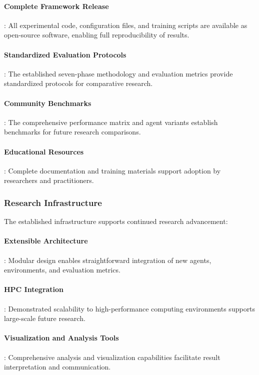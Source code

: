 \documentclass[12pt,oneside]{article}
\begin{document}
\paragraph{Complete Framework Release}: All experimental code, configuration files, and training scripts are available as open-source software, enabling full reproducibility of results.

\paragraph{Standardized Evaluation Protocols}: The established seven-phase methodology and evaluation metrics provide standardized protocols for comparative research.

\paragraph{Community Benchmarks}: The comprehensive performance matrix and agent variants establish benchmarks for future research comparisons.

\paragraph{Educational Resources}: Complete documentation and training materials support adoption by researchers and practitioners.

\subsubsection{Research Infrastructure}
The established infrastructure supports continued research advancement:

\paragraph{Extensible Architecture}: Modular design enables straightforward integration of new agents, environments, and evaluation metrics.

\paragraph{HPC Integration}: Demonstrated scalability to high-performance computing environments supports large-scale future research.

\paragraph{Visualization and Analysis Tools}: Comprehensive analysis and visualization capabilities facilitate result interpretation and communication.
\end{document}
